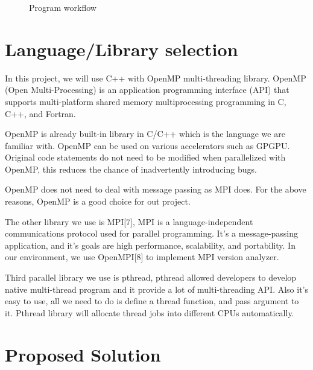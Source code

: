 \documentclass{acm_proc_article-sp}
\begin{document}
\begin{figure}
	\centering
	\caption{Program workflow}
\end{figure}

\section{Language/Library selection}
	In this project, we will use C++ with OpenMP multi-threading library.
	OpenMP (Open Multi-Processing) is an application programming interface 
	(API) that supports multi-platform shared memory multiprocessing 
	programming in C, C++, and Fortran.

	OpenMP is already built-in library in C/C++ which is the language we are familiar with.
	OpenMP can be used on various accelerators such as GPGPU. Original code statements do not 
	need to be modified when parallelized with OpenMP, this reduces the chance 
	of inadvertently introducing bugs.
	
	OpenMP does not need to deal with message passing as MPI does. For the above 
	reasons, OpenMP is a good choice for out project.

	The other library we use is MPI[7], MPI is a language-independent communications
	protocol used for parallel programming. It's a message-passing application, and
	it's goals are high performance, scalability, and portability.	In our environment, 
	we use OpenMPI[8] to implement MPI version analyzer.
	
	Third parallel library we use is pthread, pthread allowed developers to develop 
	native multi-thread program and it provide a lot of multi-threading API. Also
	it's easy to use, all we need to do is define a thread function, and pass argument
	to it. Pthread library will allocate thread jobs into different CPUs automatically.

\section{Proposed Solution}
\end{document}

